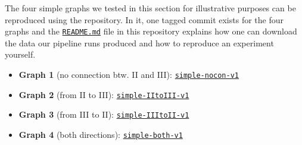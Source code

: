 \begin{tcolorbox}[title=\faIcon{recycle} Reproducibility, parbox=false]
    The four simple graphs we tested in this section for illustrative purposes can be reproduced using the  repository. In it, one tagged commit exists for the four graphs and the \href{https://github.com/rmnldwg/lynference#readme}{ \texttt{README.md}} file in this repository explains how one can download the data our pipeline runs produced and how to reproduce an experiment yourself.

    \begin{itemize}
        \item \textbf{Graph 1} (no connection btw. II and III): \href{https://github.com/rmnldwg/lynference/releases/tag/simple-nocon-v1}{ \texttt{simple-nocon-v1}}
        \item \textbf{Graph 2} (from II to III): \href{https://github.com/rmnldwg/lynference/releases/tag/simple-IItoIII-v1}{ \texttt{simple-IItoIII-v1}}
        \item \textbf{Graph 3} (from III to II): \href{https://github.com/rmnldwg/lynference/releases/tag/simple-IIItoII-v1}{ \texttt{simple-IIItoII-v1}}
        \item \textbf{Graph 4} (both directions): \href{https://github.com/rmnldwg/lynference/releases/tag/simple-both-v1}{ \texttt{simple-both-v1}}
    \end{itemize}
\end{tcolorbox}
